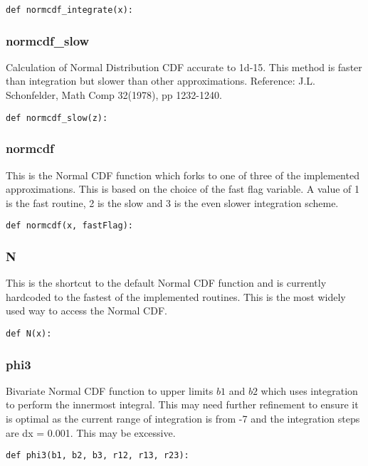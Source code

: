 \documentclass[twoside,11pt]{book}
\begin{document}
\begin{lstlisting}
def normcdf_integrate(x):
\end{lstlisting}

\subsubsection*{{\bf normcdf\_slow}}
Calculation of Normal Distribution CDF accurate to 1d-15. This method is faster than integration but slower than other approximations. Reference: J.L. Schonfelder, Math Comp 32(1978), pp 1232-1240.  

\begin{lstlisting}
def normcdf_slow(z):
\end{lstlisting}

\subsubsection*{{\bf normcdf}}
This is the Normal CDF function which forks to one of three of the implemented approximations. This is based on the choice of the fast flag variable. A value of 1 is the fast routine, 2 is the slow and 3 is the even slower integration scheme.  

\begin{lstlisting}
def normcdf(x, fastFlag):
\end{lstlisting}

\subsubsection*{{\bf N}}
This is the shortcut to the default Normal CDF function and is currently hardcoded to the fastest of the implemented routines. This is the most widely used way to access the Normal CDF.  

\begin{lstlisting}
def N(x):
\end{lstlisting}

\subsubsection*{{\bf phi3}}
Bivariate Normal CDF function to upper limits $b1$ and $b2$ which uses integration to perform the innermost integral. This may need further refinement to ensure it is optimal as the current range of integration is from -7 and the integration steps are dx = 0.001. This may be excessive.  

\begin{lstlisting}
def phi3(b1, b2, b3, r12, r13, r23):
\end{lstlisting}
\end{document}
